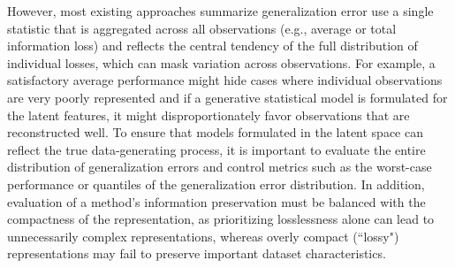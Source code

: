 However, most existing approaches summarize generalization error use a single statistic that is aggregated across all observations (e.g., average or total information loss) and reflects the central tendency of the full distribution of individual losses, which can mask variation across observations.
For example, a satisfactory average performance might hide cases where individual observations are very poorly represented and if a generative statistical model is formulated for the latent features, it might disproportionately favor observations that are reconstructed well.
To ensure that models formulated in the latent space can reflect the true data-generating process, it is important to evaluate the entire distribution of generalization errors and control metrics such as the worst-case performance or quantiles of the generalization error distribution.
In addition, evaluation of a method's information preservation must be balanced with the compactness of the representation, as prioritizing losslessness alone can lead to unnecessarily complex representations, whereas overly compact (``lossy") representations may fail to preserve important dataset characteristics.

